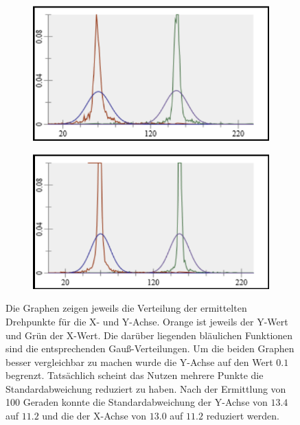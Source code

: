 \begin{figure}
    \centering
    \begin{subfigure}[t]{0.45\textwidth}
        \includegraphics[width=\textwidth]{gfx/pendel2_1_stats.png}
        \label{fig:pendel2_1_stats}
    \end{subfigure}
    \begin{subfigure}[t]{0.45\textwidth}
        \includegraphics[width=\textwidth]{gfx/pendel2_2_stats.png}
        \label{fig:pendel2_2_stats}
    \end{subfigure}
    \caption[Daten der Versuche  und ]{Die Graphen zeigen jeweils die Verteilung der ermittelten Drehpunkte für die X- und Y-Achse. Orange ist jeweils der Y-Wert und Grün der X-Wert. Die darüber liegenden bläulichen Funktionen sind die entsprechenden Gau{\ss}-Verteilungen.
    Um die beiden Graphen besser vergleichbar zu machen wurde die Y-Achse auf den Wert $0.1$ begrenzt. Tatsächlich scheint das Nutzen mehrere Punkte die Standardabweichung reduziert zu haben. Nach der Ermittlung von 100 Geraden konnte die Standardabweichung der Y-Achse von $13.4$ auf $11.2$ und die der X-Achse von $13.0$ auf $11.2$ reduziert werden.}
    \label{fig:pendel2_1_2_stats}
\end{figure}

